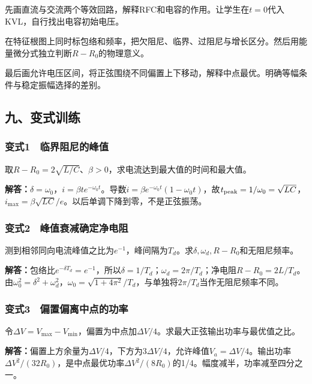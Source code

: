\documentclass[12pt,a4paper,fontset=fandol]{ctexart}
\begin{document}
先画直流与交流两个等效回路，解释RFC和电容的作用。让学生在\(t=0\)代入KVL，自行找出电容初始电压。

在特征根图上同时标包络和频率，把欠阻尼、临界、过阻尼与增长区分。然后用能量微分式独立判断\(R-R_0\)的物理意义。

最后画允许电压区间，将正弦围绕不同偏置上下移动，解释中点最优。明确等幅条件与稳定振幅选择的差别。

\subsection{九、变式训练}\label{ux4e5dux53d8ux5f0fux8badux7ec3-2}

\subsubsection{变式1　临界阻尼的峰值}\label{ux53d8ux5f0f1-ux4e34ux754cux963bux5c3cux7684ux5cf0ux503c}

取\(R-R_0=2\sqrt{L/C}\)、\(\beta>0\)，求电流达到最大值的时间和最大值。

\textbf{解答：}\(\delta=\omega_0\)，\(i=\beta t e^{-\omega_0t}\)。导数\(\dot i=\beta e^{-\omega_0t}(1-\omega_0t)\)，故\(t_{\rm peak}=1/\omega_0=\sqrt{LC}\)，\(i_{\max}=\beta\sqrt{LC}/e\)。以后单调下降到零，不是正弦振荡。

\subsubsection{变式2　峰值衰减确定净电阻}\label{ux53d8ux5f0f2-ux5cf0ux503cux8870ux51cfux786eux5b9aux51c0ux7535ux963b}

测到相邻同向电流峰值之比为\(e^{-1}\)，峰间隔为\(T_d\)。求\(\delta,\omega_d,R-R_0\)和无阻尼频率。

\textbf{解答：}包络比\(e^{-\delta T_d}=e^{-1}\)，所以\(\delta=1/T_d\)；\(\omega_d=2\pi/T_d\)；净电阻\(R-R_0=2L/T_d\)。由\(\omega_0^2=\delta^2+\omega_d^2\)，\(\omega_0=\sqrt{1+4\pi^2}/T_d\)，与单独将\(2\pi/T_d\)当作无阻尼频率不同。

\subsubsection{变式3　偏置偏离中点的功率}\label{ux53d8ux5f0f3-ux504fux7f6eux504fux79bbux4e2dux70b9ux7684ux529fux7387}

令\(\Delta V=V_{\max}-V_{\min}\)，偏置为中点加\(\Delta V/4\)。求最大正弦输出功率与最优值之比。

\textbf{解答：}偏置上方余量为\(\Delta V/4\)，下方为\(3\Delta V/4\)，允许峰值\(V_a=\Delta V/4\)。输出功率\(\Delta V^2/(32R_0)\)，是中点最优功率\(\Delta V^2/(8R_0)\)的1/4。幅度减半，功率减至四分之一。
\end{document}
